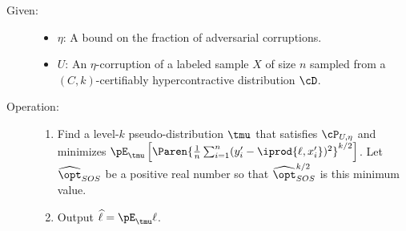                                  
\begin{mdframed}
  \begin{algorithms}
    \label{alg:robust-regression-program}\mbox{}
    \begin{description}
    \item[Given:]
    \begin{itemize}
    \item $\eta$: A bound on the fraction of adversarial corruptions. 
    \item $U$: An $\eta$-corruption of a labeled sample $X$ of size $n$ sampled from a $(C,k)$-certifiably hypercontractive distribution $\cD$.

    \end{itemize}
    \item[Operation:]\mbox{}
      \begin{enumerate}
      \item 
        Find a level-$k$ pseudo-distribution $\tmu$ that satisfies $\cP_{U,\eta}$ and minimizes $\pE_{\tmu}\left[\Paren{\frac{1}{n} \sum_{i = 1}^n (y_i' - \iprod{\ell,x_i'})^2}^{k/2}\right]$. Let $\widehat{\opt}_{SOS}$ be a positive real number so that $\widehat{\opt}_{SOS}^{k/2}$ is this minimum value. 
      \item Output $\widehat{\ell} = \pE_{\tmu}\ell$.
      \end{enumerate}
    \end{description}    
  \end{algorithms}
\end{mdframed}

